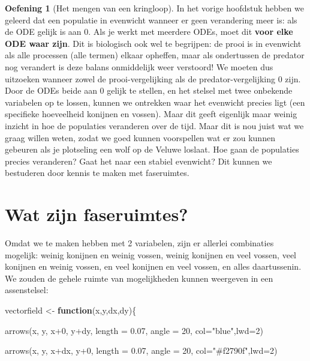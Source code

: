 \documentclass[
  a4paper,
]{scrbook}
\newenvironment{Shaded}{\begin{snugshade}}{\end{snugshade}}
\newcommand{\AttributeTok}[1]{\textcolor[rgb]{0.40,0.45,0.13}{#1}}
\newcommand{\ControlFlowTok}[1]{\textcolor[rgb]{0.00,0.23,0.31}{\textbf{#1}}}
\newcommand{\DecValTok}[1]{\textcolor[rgb]{0.68,0.00,0.00}{#1}}
\newcommand{\FloatTok}[1]{\textcolor[rgb]{0.68,0.00,0.00}{#1}}
\newcommand{\FunctionTok}[1]{\textcolor[rgb]{0.28,0.35,0.67}{#1}}
\newcommand{\NormalTok}[1]{\textcolor[rgb]{0.00,0.23,0.31}{#1}}
\newcommand{\OtherTok}[1]{\textcolor[rgb]{0.00,0.23,0.31}{#1}}
\newcommand{\SpecialCharTok}[1]{\textcolor[rgb]{0.37,0.37,0.37}{#1}}
\newcommand{\StringTok}[1]{\textcolor[rgb]{0.13,0.47,0.30}{#1}}
\theoremstyle{definition}
\newtheorem{exercise}{Oefening}[chapter]
\theoremstyle{remark}
\begin{document}
\begin{exercise}[Het mengen van een
kringloop]
In het vorige hoofdstuk hebben we geleerd dat een populatie in evenwicht
wanneer er geen verandering meer is: als de ODE gelijk is aan \(0\). Als
je werkt met meerdere ODEs, moet dit \textbf{voor elke ODE waar zijn}.
Dit is biologisch ook wel te begrijpen: de prooi is in evenwicht als
alle processen (alle termen) elkaar opheffen, maar als ondertussen de
predator nog verandert is deze balans onmiddelijk weer verstoord! We
moeten dus uitzoeken wanneer zowel de prooi-vergelijking als de
predator-vergelijking \(0\) zijn. Door de ODEs beide aan 0 gelijk te
stellen, en het stelsel met twee onbekende variabelen op te lossen,
kunnen we ontrekken waar het evenwicht precies ligt (een specifieke
hoeveelheid konijnen en vossen). Maar dit geeft eigenlijk maar weinig
inzicht in hoe de populaties veranderen over de tijd. Maar dit is nou
juist wat we graag willen weten, zodat we goed kunnen voorspellen wat er
zou kunnen gebeuren als je plotseling een wolf op de Veluwe loslaat. Hoe
gaan de populaties precies veranderen? Gaat het naar een stabiel
evenwicht? Dit kunnen we bestuderen door kennis te maken met
faseruimtes.

\section{Wat zijn faseruimtes?}\label{wat-zijn-faseruimtes}

Omdat we te maken hebben met 2 variabelen, zijn er allerlei combinaties
mogelijk: weinig konijnen en weinig vossen, weinig konijnen en veel
vossen, veel konijnen en weinig vossen, en veel konijnen en veel vossen,
en alles daartussenin. We zouden de gehele ruimte van mogelijkheden
kunnen weergeven in een assenstelsel:

\begin{Shaded}
\begin{Highlighting}[]
\NormalTok{vectorfield }\OtherTok{\textless{}{-}} \ControlFlowTok{function}\NormalTok{(x,y,dx,dy)\{}

  \FunctionTok{arrows}\NormalTok{(x, y, x}\SpecialCharTok{+}\DecValTok{0}\NormalTok{, y}\SpecialCharTok{+}\NormalTok{dy, }\AttributeTok{length =} \FloatTok{0.07}\NormalTok{, }\AttributeTok{angle =} \DecValTok{20}\NormalTok{, }\AttributeTok{col=}\StringTok{"blue"}\NormalTok{,}\AttributeTok{lwd=}\DecValTok{2}\NormalTok{)}

  \FunctionTok{arrows}\NormalTok{(x, y, x}\SpecialCharTok{+}\NormalTok{dx, y}\SpecialCharTok{+}\DecValTok{0}\NormalTok{, }\AttributeTok{length =} \FloatTok{0.07}\NormalTok{, }\AttributeTok{angle =} \DecValTok{20}\NormalTok{, }\AttributeTok{col=}\StringTok{"\#f2790f"}\NormalTok{,}\AttributeTok{lwd=}\DecValTok{2}\NormalTok{)}


\end{Highlighting}
\end{Shaded}
\end{exercise}
\end{document}
